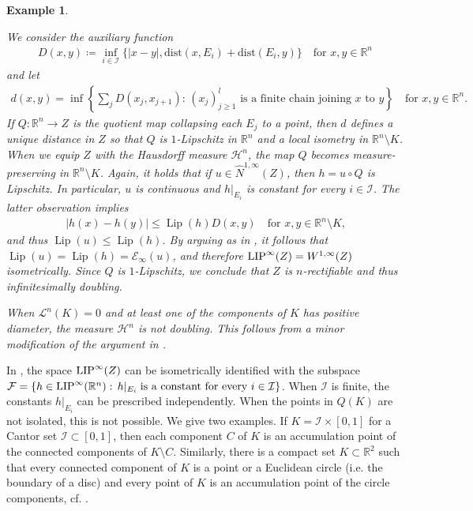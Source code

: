 \documentclass[reqno]{amsart}
\newcommand{\LIP}{{\rm LIP}}
\numberwithin{equation}{section}
\newtheorem{example}[theorem]{Example}
\theoremstyle{remark}
\DeclareMathOperator{\lip}{Lip}
\begin{document}
\begin{example}\label{ex:example:collapsing:more}
{\em We consider the auxiliary function
\begin{align*}
    D( x, y )
    \coloneqq
    \inf_{i\in\mathcal I}\{ |x-y|, \mathrm{dist}(x,E_i) + \mathrm{dist}(E_i,y) \}
    \quad\text{for $x, y \in \mathbb{R}^{n}$}
\end{align*}
 and let
\begin{align*}
    d( x, y )
    =
    \inf \left\{\sum_{ j } D( x_j, x_{j+1} ):\, \text{$( x_j )_{j \geq 1}^{l}$ is a finite chain joining $x$ to $y$}\right\}
    \quad\text{for $x, y \in \mathbb{R}^n$.}
\end{align*}
If $Q \colon \mathbb{R}^n \rightarrow Z$ is the quotient map collapsing each $E_j$ to a point, then $d$ defines a unique distance in $Z$ so that $Q$ is $1$-Lipschitz in $\mathbb{R}^n$ and a local isometry in $\mathbb{R}^n \setminus K$. When we equip $Z$ with the Hausdorff measure $\mathcal{H}^n$, the map $Q$ becomes measure-preserving in $\mathbb{R}^n \setminus K$. Again, it holds that if $u \in \widehat{N}^{1,\infty}(Z)$, then $h = u \circ Q$ is Lipschitz. In particular, $u$ is continuous and $h|_{ E_i }$ is constant for every $i \in \mathcal{I}$. The latter observation implies
\begin{align*}
    |h(x)-h(y)| \leq \lip(h)D(x,y) \quad\text{for $x, y \in \mathbb{R}^n \setminus K$,}
\end{align*}
and thus $\lip(u) \leq \lip(h)$. By arguing as in , it follows that $\lip(u) = \lip(h) = \mathscr{E}_{\infty}(u)$, and therefore $\LIP^\infty(Z)=W^{1,\infty}(Z)$ isometrically. Since $Q$ is $1$-Lipschitz, we conclude that $Z$ is $n$-rectifiable and thus infinitesimally doubling.

When $\mathcal{L}^{n}( K ) = 0$ and at least one of the components of $K$ has positive diameter, the measure $\mathcal{H}^n$ is not doubling. This follows from a minor modification of the argument in .}
\end{example}
In , the space $\LIP^{\infty}(Z)$ can be isometrically identified with the subspace $\mathcal{F}=\{h\in \LIP^{\infty}(\mathbb{R}^n):\, h|_{ E_i }\; \text{is a constant for every $i \in \mathcal{I}$}\}$. When $\mathcal{I}$ is finite, the constants $h|_{ E_i }$ can be prescribed independently. When the points in $Q(K)$ are not isolated, this is not possible. We give two examples. If $K = \mathcal{I} \times [0,1]$ for a Cantor set $\mathcal{I} \subset [0,1]$, then each component $C$ of $K$ is an accumulation point of the connected components of $K \setminus C$. Similarly, there is a compact set $K \subset \mathbb{R}^2$ such that every connected component of $K$ is a point or a Euclidean circle (i.e. the boundary of a disc) and every point of $K$ is an accumulation point of the circle components, cf. \cite[Example, p. 1308-1309]{Younsi:16}.
\end{document}
